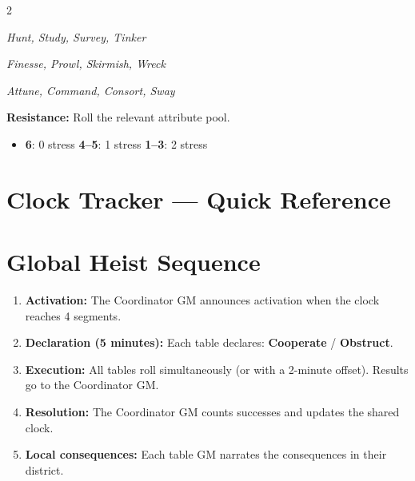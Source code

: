 \begin{multicols}{2}
\begin{description}[leftmargin=2.5cm]
  \item[\textbf{Insight}]
    \textit{Hunt, Study, Survey, Tinker}
  \item[\textbf{Prowess}]
    \textit{Finesse, Prowl, Skirmish, Wreck}
  \item[\textbf{Resolve}]
    \textit{Attune, Command, Consort, Sway}
\end{description}

\medskip
\textbf{Resistance:} Roll the relevant attribute pool.
\begin{itemize}
  \item \textbf{6}: 0 stress \quad \textbf{4--5}: 1 stress \quad \textbf{1--3}: 2 stress
\end{itemize}

\end{multicols}

\section{Clock Tracker --- Quick Reference}
\label{sec:ref-clocks}


\section{Global Heist Sequence}
\label{sec:ref-global}

\begin{enumerate}
  \item \textbf{Activation:} The Coordinator GM announces activation
        when the clock reaches 4 segments.
  \item \textbf{Declaration (5 minutes):} Each table declares:
        \textbf{Cooperate} / \textbf{Obstruct}.
  \item \textbf{Execution:} All tables roll simultaneously
        (or with a 2-minute offset). Results go to the Coordinator GM.
  \item \textbf{Resolution:} The Coordinator GM counts successes
        and updates the shared clock.
  \item \textbf{Local consequences:} Each table GM narrates
        the consequences in their district.
\end{enumerate}

